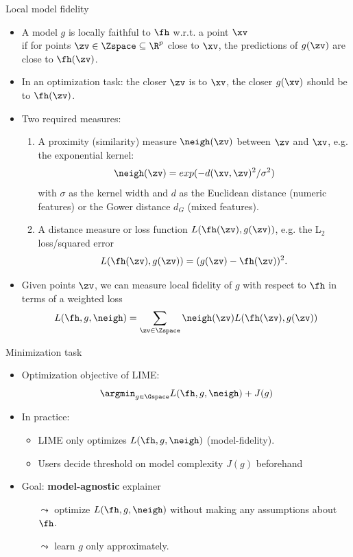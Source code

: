 \documentclass[11pt,compress,t,notes=noshow, aspectratio=169, xcolor=table]{beamer}
\begin{document}
\begin{vbframe}{Local model fidelity}
 	\begin{itemize}
 		\item A model $g$ is locally faithful to $\fh$ w.r.t. a point $\xv$\\ 
 		if for points $\zv \in \Zspace \subseteq \R^p$ close to $\xv$, the predictions of $g(\zv)$ are close to $\fh(\zv)$. 
 		\item In an optimization task: the closer $\zv$ is to $\xv$, the closer $g(\xv)$ should be to $\fh(\zv)$.  
 		\pause
 		\item Two required measures:
 		\begin{enumerate}
 			\item A proximity (similarity) measure $\neigh(\zv)$ between $\zv$ and $\xv$, e.g. the exponential kernel:
 			$$\neigh(\zv) = exp(-d(\xv, \zv)^2/\sigma^2)$$ 
 			with $\sigma$ as the kernel width and $d$ as the Euclidean distance (numeric features) or the Gower distance $d_G$ (mixed features). 
 			\pause
 			\item A distance measure or loss function $L(\fh(\zv), g(\zv))$, e.g. the L$_2$ loss/squared error
 			$$L(\fh(\zv), g(\zv)) = (g(\zv) - \fh(\zv))^2.$$ 
 		\end{enumerate}
 		\pause
 		\item Given points $\zv$, we can measure local fidelity of $g$ with respect to $\fh$ in terms of a weighted loss
 		$$ L(\fh, g, \neigh) = \sum_{\zv \in \Zspace} \neigh(\zv) L(\fh(\zv), g(\zv)) $$
 	\end{itemize}
\end{vbframe}

\begin{vbframe}[c]{Minimization task}
	\begin{itemize}
		\item Optimization objective of LIME: 
		$$ \argmin_{g \in \Gspace} L(\fh, g, \neigh) + J(g)$$
		\item In practice:
		\begin{itemize}
		    \item LIME only optimizes $L(\fh, g, \neigh)$ (model-fidelity). 	
		    \item Users decide threshold on model complexity $J(g)$ beforehand
		\end{itemize}
		\item Goal: \textbf{model-agnostic} explainer
		\begin{itemize}
    		\item[$\leadsto$] optimize $L(\fh, g, \neigh)$ without making any assumptions about $\fh$. 
    		\item[$\leadsto$] learn $g$ only approximately.  
		\end{itemize}
		\end{itemize}
\end{vbframe} 
\end{document}

